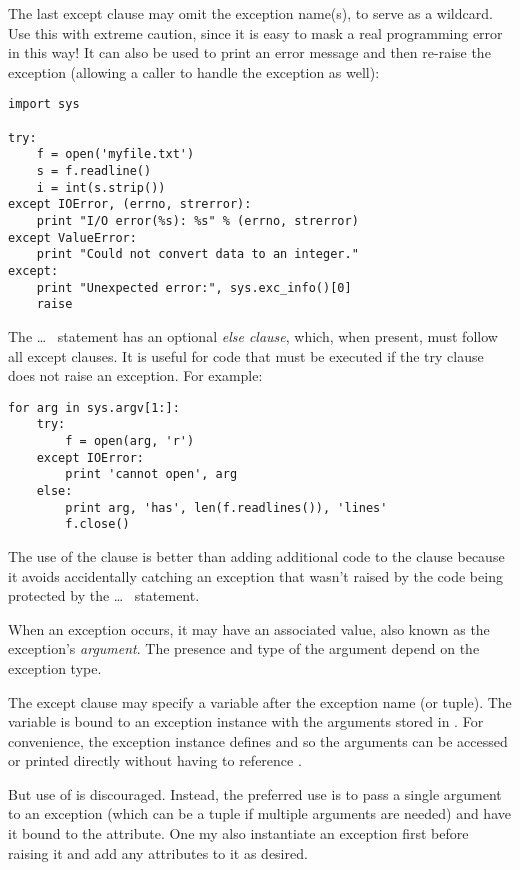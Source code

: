 \documentclass{manual}
\begin{document}
The last except clause may omit the exception name(s), to serve as a
wildcard.  Use this with extreme caution, since it is easy to mask a
real programming error in this way!  It can also be used to print an
error message and then re-raise the exception (allowing a caller to
handle the exception as well):

\begin{verbatim}
import sys

try:
    f = open('myfile.txt')
    s = f.readline()
    i = int(s.strip())
except IOError, (errno, strerror):
    print "I/O error(%s): %s" % (errno, strerror)
except ValueError:
    print "Could not convert data to an integer."
except:
    print "Unexpected error:", sys.exc_info()[0]
    raise
\end{verbatim}

The  \ldots\  statement has an optional
\emph{else clause}, which, when present, must follow all except
clauses.  It is useful for code that must be executed if the try
clause does not raise an exception.  For example:

\begin{verbatim}
for arg in sys.argv[1:]:
    try:
        f = open(arg, 'r')
    except IOError:
        print 'cannot open', arg
    else:
        print arg, 'has', len(f.readlines()), 'lines'
        f.close()
\end{verbatim}

The use of the  clause is better than adding additional
code to the  clause because it avoids accidentally
catching an exception that wasn't raised by the code being protected
by the  \ldots\  statement.


When an exception occurs, it may have an associated value, also known as
the exception's \emph{argument}.
The presence and type of the argument depend on the exception type.

The except clause may specify a variable after the exception name (or tuple).
The variable is bound to an exception instance with the arguments stored
in .  For convenience, the exception instance
defines  and  so the arguments can
be accessed or printed directly without having to reference .

But use of  is discouraged.  Instead, the preferred use is to pass
a single argument to an exception (which can be a tuple if multiple arguments
are needed) and have it bound to the  attribute.  One my also
instantiate an exception first before raising it and add any attributes to it
as desired.
\end{document}
